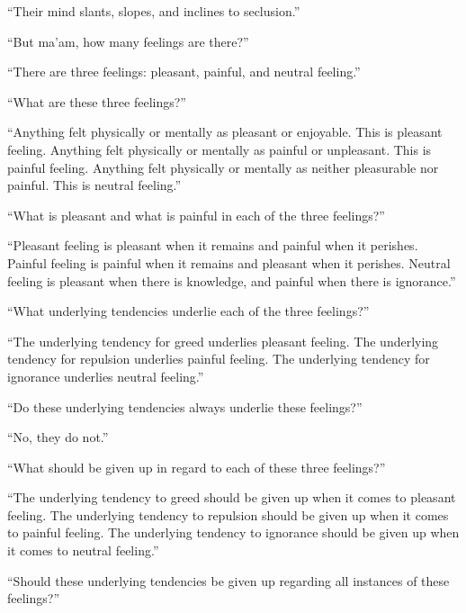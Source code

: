 \documentclass[12pt,openany]{book}%
\begin{document}
“Their mind slants, slopes, and inclines to seclusion.” 

“But ma’am, how many feelings are there?” 

“There are three feelings: pleasant, painful, and neutral feeling.” 

“What are these three feelings?” 

“Anything felt physically or mentally as pleasant or enjoyable. This is pleasant feeling. Anything felt physically or mentally as painful or unpleasant. This is painful feeling. Anything felt physically or mentally as neither pleasurable nor painful. This is neutral feeling.” 

“What is pleasant and what is painful in each of the three feelings?” 

“Pleasant feeling is pleasant when it remains and painful when it perishes. Painful feeling is painful when it remains and pleasant when it perishes. Neutral feeling is pleasant when there is knowledge, and painful when there is ignorance.” 

“What underlying tendencies underlie each of the three feelings?” 

“The underlying tendency for greed underlies pleasant feeling. The underlying tendency for repulsion underlies painful feeling. The underlying tendency for ignorance underlies neutral feeling.” 

“Do these underlying tendencies always underlie these feelings?” 

“No, they do not.” 

“What should be given up in regard to each of these three feelings?” 

“The underlying tendency to greed should be given up when it comes to pleasant feeling. The underlying tendency to repulsion should be given up when it comes to painful feeling. The underlying tendency to ignorance should be given up when it comes to neutral feeling.” 

“Should these underlying tendencies be given up regarding all instances of these feelings?” 
\end{document}
